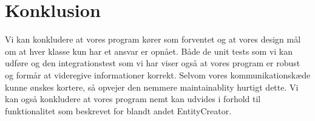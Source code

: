 \section{Konklusion}
Vi kan konkludere at vores program kører som forventet og at vores design mål om at hver klasse kun har et ansvar er opnået. Både de unit tests som vi kan udføre og den integrationstest som vi har viser også at vores program er robust og formår at videregive informationer korrekt. Selvom vores kommunikationskæde kunne ønskes kortere, så opvejer den nemmere maintainablity hurtigt dette. Vi kan også konkludere at vores program nemt kan udvides i forhold til funktionalitet som beskrevet for blandt andet EntityCreator.
